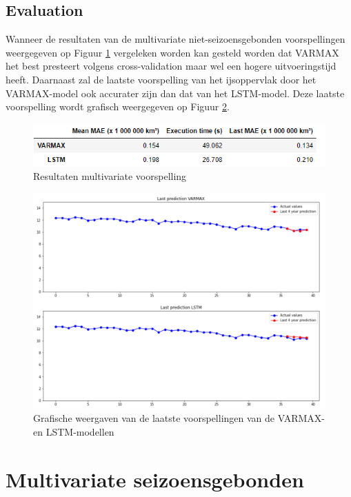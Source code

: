 \subsection{Evaluation}

Wanneer de resultaten van de multivariate niet-seizoensgebonden voorspellingen weergegeven op Figuur \ref{fig:mvnsresult} vergeleken worden kan gesteld worden dat VARMAX het best presteert volgens cross-validation maar wel een hogere uitvoeringstijd heeft. Daarnaast zal de laatste voorspelling van het ijsoppervlak door het VARMAX-model ook accurater zijn dan dat van het LSTM-model. Deze laatste voorspelling wordt grafisch weergegeven op Figuur \ref{fig:mvnsresultgraph}.

\begin{figure}[!h]
    \centering
    \caption{Resultaten multivariate voorspelling}
    \label{fig:mvnsresult}
    \includegraphics[width=0.9\linewidth]{mv_ns_result}
\end{figure}

\begin{figure}[!h]
    \centering
    \caption{Grafische weergaven van de laatste voorspellingen van de VARMAX- en LSTM-modellen}
    \label{fig:mvnsresultgraph}
    \includegraphics[width=1\linewidth]{mv_ns_result_graph}
\end{figure}


\clearpage
\section{Multivariate seizoensgebonden}

